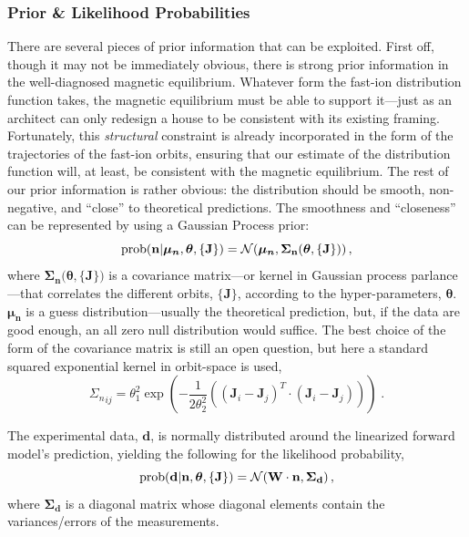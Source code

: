 \subsubsection{Prior \& Likelihood Probabilities}
There are several pieces of prior information that can be exploited.
First off, though it may not be immediately obvious, there is strong prior information in the well-diagnosed magnetic equilibrium.
Whatever form the fast-ion distribution function takes, the magnetic equilibrium must be able to support it---just as an architect can only redesign a house to be consistent with its existing framing.
Fortunately, this \textit{structural} constraint is already incorporated in the form of the trajectories of the fast-ion orbits, ensuring that our estimate of the distribution function will, at least, be consistent with the magnetic equilibrium.  
The rest of our prior information is rather obvious: the distribution should be smooth, non-negative, and ``close'' to  theoretical predictions. The smoothness and ``closeness'' can be represented by using a Gaussian Process prior:
\begin{equation}\label{eq:prior}
    \rm{prob}(\mathbf{n}|\boldsymbol{\mu_n},\boldsymbol{\theta},\{\mathbf{J}\})  =
    \mathcal{N}(\boldsymbol{\mu_n},\mathbf{\Sigma_n(\boldsymbol{\theta},\{\mathbf{J}\}}))\,,
\end{equation}
where $\mathbf{\Sigma_n(\boldsymbol{\theta},\{\mathbf{J}\}})$ is a covariance matrix---or kernel in Gaussian process parlance---that correlates the different orbits, $\{\mathbf{J}\}$, according to the hyper-parameters, $\boldsymbol{\theta}$. $\boldsymbol{\mu_n}$ is a guess distribution---usually the theoretical prediction, but, if the data are good enough, an all zero null distribution would suffice.
The best choice of the form of the covariance matrix is still an open question, but here a standard squared exponential kernel in orbit-space is used, 
\begin{equation}\label{eq:kernel}
    {\Sigma_n}_{ij} = \theta_1^2 \exp \left (-\frac{1}{2\theta_2^2}\left ( (\mathbf{J}_i - \mathbf{J}_j)^T\cdot (\mathbf{J}_i - \mathbf{J}_j)\right ) \right ) \;.
\end{equation}

The experimental data, $\mathbf{d}$, is normally distributed around the linearized forward model's prediction, yielding the following for the likelihood probability,
\begin{equation}\label{eq:likelihood}
    \rm{prob}(\mathbf{d}|\mathbf{n},\boldsymbol{\theta},\{\mathbf{J}\}) = \mathcal{N}(\mathbf{W}\cdot\mathbf{n},\mathbf{\Sigma_d}) \,,
\end{equation}
where $\mathbf{\Sigma_d}$ is a diagonal matrix whose diagonal elements contain the variances/errors of the measurements.

